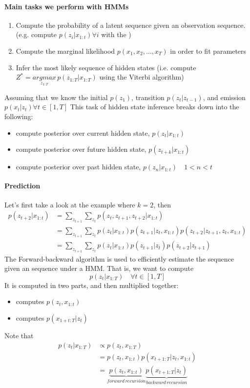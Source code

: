 \documentclass[11pt]{article}
\begin{document}
\paragraph{Main tasks we perform with HMMs}
\begin{enumerate}
	\item Compute the probability of a latent sequence given an observation sequence. (e.g. compute $p(z_i|x_{1:t}) \forall i$ with the )
	\item Compute the marginal likelihood $p(x_1, x_2, \hdots, x_T)$ in order to fit parameters
	\item Infer the most likely sequence of hidden states (i.e. compute $Z^* = \underset{z_{1:T}}{arg max} \, p(z_{1:T}|x_{1:T})$ using the Viterbi algorithm)
\end{enumerate}
Assuming that we know the initial $p(z_1)$, transition $p(z_t|z_{t-1})$, and emission $p(x_t|z_t) \forall t\in [1, T]$
This task of hidden state inference breaks down into the following:
\begin{itemize}
	\item {}compute posterior over current hidden state, $p(z_t|x_{1:t})$
	\item {}compute posterior over future hidden state, $p(z_{t+k}|x_{1:t})$
	\item {}compute posterior over past hidden state, $p(z_n | x_{1:t})\quad 1 < n < t$
\end{itemize}
\paragraph{Prediction}
Let's first take a look at the example where $k = 2$, then
\begin{align*}
	p(z_{t+2}|x_{1:t}) &= \sum_{z_{t+1}}\sum_{z_t}p(z_t,z_{t+1},z_{t+2}|x_{1:t}) \\
	&= \sum_{z_{t+1}}\sum_{z_t}p(z_t|x_{1:t})p(z_{t+1}|z_t, x_{1:t})p(z_{t+2}|z_{t+1},z_t,x_{1:t})\\
	&= \sum_{z_{t+1}}\sum_{z_t}p(z_t|x_{1:t})p(z_{t+1}|z_t)p(z_{t+2}|z_{t+1})
\end{align*}
The Forward-backward algorithm is used to efficiently estimate the  sequence given an  sequence under a HMM. That is, we want to compute $$p(z_t|x_{1:T}) \quad \forall t \in [1,T]$$
It is computed in two parts, and then multiplied together:
\begin{itemize}
	\item {}computes $p(z_t, x_{1:t})$
	\item {}computes $p(x_{1+t:T}|z_t)$
\end{itemize} 
Note that
\begin{align*}
	p(z_t|x_{1:T}) &\propto p(z_t, x_{1:T}) \\
	&= p(z_t, x_{1:t})p(x_{t+1:T}|z_t, x_{1:t}) \\
	&= \underbrace{p(z_t, x_{1:t})}_{forward\, recursion}\underbrace{p(x_{t+1:T}|z_t)}_{backward\,recursion}
\end{align*}
\end{document}
